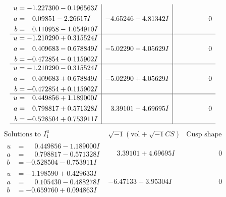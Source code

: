 \documentclass[1p]{elsarticle_modified}
\theoremstyle{definition}
\newcommand{\I}{\sqrt{-1}}
\begin{document}
$$\begin{array}{c|c|c}
\begin{aligned}
u &= -1.227300 - 0.196563 I \\
a &= \phantom{-}0.09851 - 2.26617 I \\
b &= \phantom{-}0.110958 - 1.054910 I\end{aligned}
 & -4.65246 - 4.81342 I & \phantom{-0.000000 } 0 \\ \hline\begin{aligned}
u &= -1.210290 + 0.315524 I \\
a &= \phantom{-}0.409683 - 0.678849 I \\
b &= -0.472854 - 0.115902 I\end{aligned}
 & -5.02290 - 4.05629 I & \phantom{-0.000000 } 0 \\ \hline\begin{aligned}
u &= -1.210290 - 0.315524 I \\
a &= \phantom{-}0.409683 + 0.678849 I \\
b &= -0.472854 + 0.115902 I\end{aligned}
 & -5.02290 + 4.05629 I & \phantom{-0.000000 } 0 \\ \hline\begin{aligned}
u &= \phantom{-}0.449856 + 1.189000 I \\
a &= \phantom{-}0.798817 + 0.571328 I \\
b &= -0.528504 + 0.753911 I\end{aligned}
 & \phantom{-}3.39101 - 4.69695 I & \phantom{-0.000000 } 0\\
 \hline 
 \end{array}$$\newpage$$\begin{array}{c|c|c}  
\text{Solutions to }I^u_{1}& \I (\text{vol} + \sqrt{-1}CS) & \text{Cusp shape}\\
 \hline 
\begin{aligned}
u &= \phantom{-}0.449856 - 1.189000 I \\
a &= \phantom{-}0.798817 - 0.571328 I \\
b &= -0.528504 - 0.753911 I\end{aligned}
 & \phantom{-}3.39101 + 4.69695 I & \phantom{-0.000000 } 0 \\ \hline\begin{aligned}
u &= -1.198590 + 0.429633 I \\
a &= \phantom{-}0.105430 - 0.488278 I \\
b &= -0.659760 + 0.094863 I\end{aligned}
 & -6.47133 + 3.95304 I & \phantom{-0.000000 } 0 \\ \hline\begin{aligned}

\end{aligned}
\end{array}$$
\end{document}
